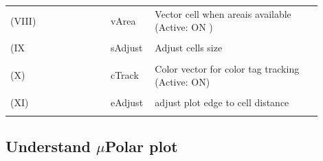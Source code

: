 \documentclass[conference]{IEEEtran}
\begin{document}
\begin{table}[ht]
\begin{tabular}{p{0.3\linewidth}p{0.1\linewidth}p{0.5\linewidth}}
\\
(VIII)& vArea &    Vector cell when areais available (Active: ON ) \\
\\
(IX& sAdjust &     Adjust cells size\\
\\
(X)& cTrack &      Color vector for color tag tracking (Active:  ON)\\
\\
(XI)& eAdjust &    adjust plot edge to cell distance\\
\\
\end{tabular}
\label{table:desc}
\end{table}


\subsection{Understand $\mu$Polar plot}
\end{document}
